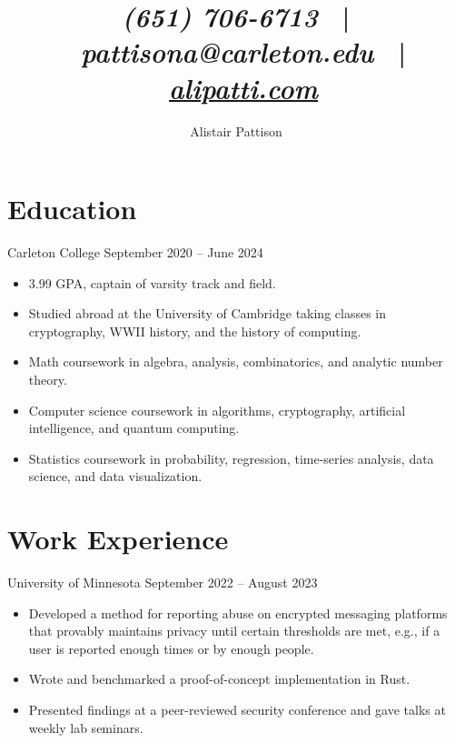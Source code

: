 \documentclass{ali-resume}
\author{Alistair Pattison}
\title{
{\it (651) 706-6713}
\ | \
{\it pattisona@carleton.edu}
\ | \
\href{http://alipatti.com}{\it alipatti.com}
}
\begin{document}
\maketitle

\section{Education}

{Carleton College}
{September 2020 -- June 2024}

\begin{itemize}
	\item 3.99 GPA, captain of varsity track and field.
	\item Studied abroad at the University of Cambridge taking classes in cryptography, WWII history, and the history of computing.
	\item Math coursework in algebra, analysis, combinatorics, and analytic number theory.
	\item Computer science coursework in algorithms, cryptography, artificial intelligence, and quantum computing.
	\item Statistics coursework in probability, regression, time-series analysis, data science, and data visualization.
\end{itemize}

%

\section{Work Experience}



{University of Minnesota}
{September 2022 -- August 2023}

\begin{itemize}
	\item Developed a method for reporting abuse on encrypted messaging platforms that provably maintains privacy until certain thresholds are met, e.g., if a user is reported enough times or by enough people.
	\item Wrote and benchmarked a proof-of-concept implementation in Rust.
	\item Presented findings at a peer-reviewed security conference and gave talks at weekly lab seminars.
\end{itemize}
\end{document}
